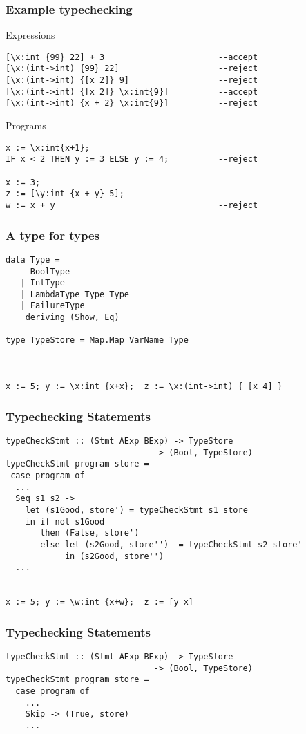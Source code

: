 \documentclass{beamer}
\begin{document}
\begin{frame}[fragile]
\frametitle{Example typechecking}
Expressions
\begin{verbatim}
[\x:int {99} 22] + 3                       --accept
[\x:(int->int) {99} 22]                    --reject
[\x:(int->int) {[x 2]} 9]                  --reject
[\x:(int->int) {[x 2]} \x:int{9}]          --accept
[\x:(int->int) {x + 2} \x:int{9}]          --reject
\end{verbatim}
Programs
\begin{verbatim}
x := \x:int{x+1};
IF x < 2 THEN y := 3 ELSE y := 4;          --reject

x := 3; 
z := [\y:int {x + y} 5]; 
w := x + y                                 --reject
\end{verbatim}
\end{frame}

\begin{frame}[fragile]
\frametitle{A type for types}
\begin{verbatim}
data Type =
     BoolType
   | IntType
   | LambdaType Type Type
   | FailureType 
    deriving (Show, Eq)

type TypeStore = Map.Map VarName Type



x := 5; y := \x:int {x+x};  z := \x:(int->int) { [x 4] }
\end{verbatim}

\end{frame}


\begin{frame}[fragile]
\frametitle{Typechecking Statements}
\begin{verbatim}
typeCheckStmt :: (Stmt AExp BExp) -> TypeStore 
                              -> (Bool, TypeStore)
typeCheckStmt program store =
 case program of
  ...
  Seq s1 s2 ->
    let (s1Good, store') = typeCheckStmt s1 store
    in if not s1Good
       then (False, store')
       else let (s2Good, store'')  = typeCheckStmt s2 store'
            in (s2Good, store'')
  ...


x := 5; y := \w:int {x+w};  z := [y x]
\end{verbatim}
\end{frame}

\begin{frame}[fragile]
\frametitle{Typechecking Statements}
\begin{verbatim}
typeCheckStmt :: (Stmt AExp BExp) -> TypeStore 
                              -> (Bool, TypeStore)
typeCheckStmt program store =
  case program of
    ...
    Skip -> (True, store)
    ...
\end{verbatim}
\end{frame}
\end{document}

